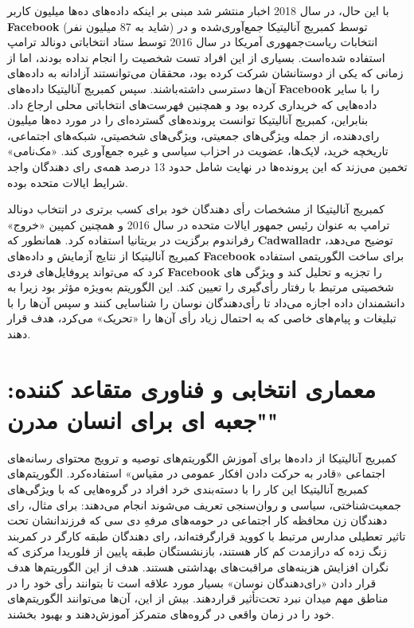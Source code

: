 با این حال، در سال 2018 اخبار منتشر شد مبنی بر اینکه داده‌های ده‌ها میلیون کاربر \textenglish{\textbf{Facebook}} (شاید به 87 میلیون نفر) توسط کمبریج آنالیتیکا جمع‌آوری‌شده و در انتخابات ریاست‌جمهوری آمریکا در سال 2016 توسط ستاد انتخاباتی دونالد ترامپ استفاده شده‌است.
بسیاری از این افراد تست شخصیت را انجام نداده بودند، اما از زمانی که یکی از دوستانشان شرکت کرده بود، محققان می‌توانستند آزادانه به داده‌های آن‌ها دسترسی داشته‌باشند.
سپس کمبریج آنالیتیکا داده‌های \textenglish{\textbf{Facebook}} را با سایر داده‌هایی که خریداری کرده بود و همچنین فهرست‌های انتخاباتی محلی ارجاع داد.
بنابراین، کمبریج آنالیتیکا توانست پرونده‌های گسترده‌ای را در مورد ده‌ها میلیون رای‌دهنده، از جمله ویژگی‌های جمعیتی، ویژگی‌های شخصیتی، شبکه‌های اجتماعی، تاریخچه خرید، لایک‌ها، عضویت در احزاب سیاسی و غیره جمع‌آوری کند.
«مک‌نامی» تخمین می‌زند که این پرونده‌ها در نهایت شامل حدود 13 درصد همه‌ی رای دهندگان واجد شرایط ایالات متحده بوده.

کمبریج آنالیتیکا از مشخصات رأی دهندگان خود برای کسب برتری در انتخاب دونالد ترامپ به عنوان رئیس جمهور ایالات متحده در سال 2016 و همچنین کمپین «خروج» رفراندوم برگزیت در بریتانیا استفاده کرد.
همانطور که \textenglish{\textbf{Cadwalladr}} توضیح می‌دهد، کمبریج آنالیتیکا از نتایج آزمایش و داده‌های \textenglish{\textbf{Facebook}} برای ساخت الگوریتمی استفاده کرد که می‌تواند پروفایل‌های فردی \textenglish{\textbf{Facebook}} را تجزیه و تحلیل کند و ویژگی های شخصیتی مرتبط با رفتار رأی‌گیری را تعیین کند.
این الگوریتم به‌ویژه مؤثر بود زیرا به دانشمندان داده اجازه می‌داد تا رأی‌دهندگان نوسان را شناسایی کنند و سپس آن‌ها را با تبلیغات و پیام‌های خاصی که به احتمال زیاد رأی آن‌ها را «تحریک» می‌کرد، هدف قرار دهند.
\newline
\newline


{
\section*{معماری انتخابی و فناوری متقاعد کننده: "جعبه ای برای انسان مدرن"}
\label{sec:معماری انتخابی و فناوری متقاعد کننده: "جعبه ای برای انسان مدرن"}
کمبریج آنالیتیکا از داده‌ها برای آموزش الگوریتم‌های توصیه و ترویج محتوای رسانه‌های اجتماعی «قادر به حرکت دادن افکار عمومی در مقیاس» استفاده‌کرد.
الگوریتم‌های کمبریج آنالیتیکا این کار را با دسته‌بندی خرد افراد در گروه‌هایی که با ویژگی‌های جمعیت‌شناختی، سیاسی و روان‌سنجی تعریف می‌شوند انجام می‌دهند: برای مثال، رای دهندگان زن محافظه کار اجتماعی در حومه‌های مرفهِ دی سی که فرزندانشان تحت تاثیر تعطیلی مدارس مرتبط با کووید قرار‌گرفته‌اند، رای دهندگان طبقه کارگر در کمربند زنگ زده که درازمدت کم کار هستند، بازنشستگان طبقه پایین از فلوریدا مرکزی که نگران افزایش هزینه‌های مراقبت‌های بهداشتی هستند.
هدف از این الگوریتم‌ها هدف قرار دادن «رای‌دهندگان نوسان» بسیار مورد علاقه است تا بتوانند رأی خود را در مناطق مهم میدان نبرد تحت‌تأثیر قرار‌دهند.
بیش از این، آن‌ها می‌توانند الگوریتم‌های خود را در زمان واقعی در گروه‌های متمرکز آموزش‌دهند و بهبود بخشند.
}

